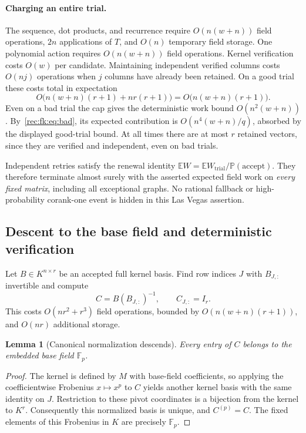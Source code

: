 \documentclass[11pt]{article}
\newtheorem{lemma}[theorem]{Lemma}
\theoremstyle{definition}
\theoremstyle{remark}
\newcommand{\E}{\mathbb E}
\newcommand{\1}{\mathbf 1}
\providecommand{\Prob}{\mathbb P}
\providecommand{\F}{\mathbb F}
\begin{document}
\paragraph{Charging an entire trial.}
The sequence, dot products, and recurrence require
$O(n(w+n))$ field operations, $2n$ applications of $T$, and
$O(n)$ temporary field storage. One polynomial action requires
$O(n(w+n))$ field operations. Kernel verification costs $O(w)$
per candidate. Maintaining independent verified columns costs
$O(nj)$ operations when $j$ columns have already been retained.
On a good trial these costs total in expectation
\[
 O\bigl(n(w+n)(r+1)+nr(r+1)\bigr)
 =O\bigl(n(w+n)(r+1)\bigr).
\]
Even on a bad trial the cap gives the deterministic work bound
$O(n^2(w+n))$. By~\eqref{rec:fk:eq:bad}, its expected contribution is
$O(n^4(w+n)/q)$, absorbed by the displayed good-trial bound.
At all times there are at most $r$ retained vectors, since they
are verified and independent, even on bad trials.

Independent retries satisfy the renewal identity
$\E W=\E W_{\mathrm{trial}}/\Prob(\mathrm{accept})$.
They therefore terminate almost surely with the asserted expected
field work on \emph{every fixed matrix}, including all exceptional
graphs. No rational fallback or high-probability corank-one event
is hidden in this Las Vegas assertion.

\subsection{Descent to the base field and deterministic verification}
Let $B\in K^{n\times r}$ be an accepted full kernel basis.
Find row indices $J$ with $B_{J,:}$ invertible and compute
\[
 C=B(B_{J,:})^{-1},\qquad C_{J,:}=I_r.
\]
This costs $O(nr^2+r^3)$ field operations, bounded by
$O(n(w+n)(r+1))$, and $O(nr)$ additional storage.

\begin{lemma}[Canonical normalization descends]\label{rec:fk:lem:descent}
Every entry of $C$ belongs to the embedded base field $\F_p$.
\end{lemma}
\begin{proof}
The kernel is defined by $M$ with base-field coefficients, so applying
the coefficientwise Frobenius $x\mapsto x^p$ to $C$ yields another
kernel basis with the same identity on $J$. Restriction to these
pivot coordinates is a bijection from the kernel to $K^r$.
Consequently this normalized basis is unique, and $C^{(p)}=C$.
The fixed elements of this Frobenius in $K$ are precisely $\F_p$.
\end{proof}
\end{document}
